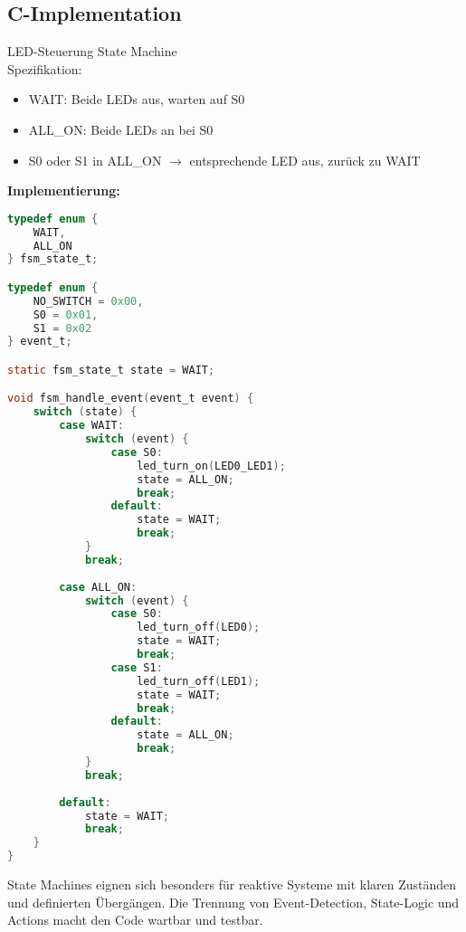 \subsection{C-Implementation}



\begin{example2}{LED-Steuerung State Machine}\\
    Spezifikation:
    \begin{itemize}
        \item WAIT: Beide LEDs aus, warten auf S0
        \item ALL\_ON: Beide LEDs an bei S0
        \item S0 oder S1 in ALL\_ON $\rightarrow$ entsprechende LED aus, zurück zu WAIT
    \end{itemize}
    
    \tcblower
    
    \textbf{Implementierung:}
\begin{lstlisting}[language=C, style=basesmol]
typedef enum {
    WAIT,
    ALL_ON
} fsm_state_t;

typedef enum {
    NO_SWITCH = 0x00,
    S0 = 0x01,
    S1 = 0x02
} event_t;

static fsm_state_t state = WAIT;

void fsm_handle_event(event_t event) {
    switch (state) {
        case WAIT:
            switch (event) {
                case S0:
                    led_turn_on(LED0_LED1);
                    state = ALL_ON;
                    break;
                default:
                    state = WAIT;
                    break;
            }
            break;
            
        case ALL_ON:
            switch (event) {
                case S0:
                    led_turn_off(LED0);
                    state = WAIT;
                    break;
                case S1:
                    led_turn_off(LED1);
                    state = WAIT;
                    break;
                default:
                    state = ALL_ON;
                    break;
            }
            break;
            
        default:
            state = WAIT;
            break;
    }
}
\end{lstlisting}
\end{example2}

\begin{remark}
    State Machines eignen sich besonders für reaktive Systeme mit klaren Zuständen und definierten Übergängen. Die Trennung von Event-Detection, State-Logic und Actions macht den Code wartbar und testbar.
\end{remark}